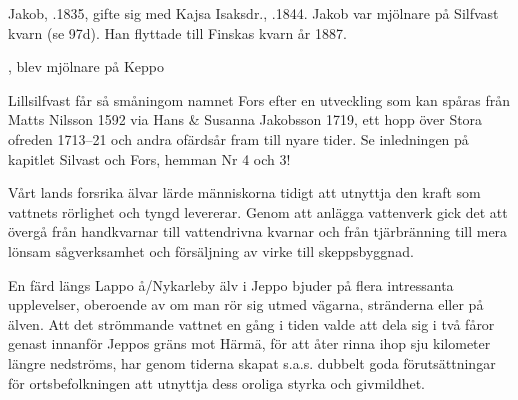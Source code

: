 %
Jakob, .1835, gifte sig med Kajsa Isaksdr., .1844. Jakob var mjölnare på Silfvast kvarn (se 97d). Han flyttade till Finskas kvarn år 1887.
\begin{jhchildren}
  \item {}, blev mjölnare på Keppo
  \item {}
  \item {}
  \item {}
  \item {}
  \item {}
\end{jhchildren}



%
Lillsilfvast får så småningom namnet Fors efter en utveckling som kan spåras från Matts Nilsson 1592 via Hans \& Susanna Jakobsson 1719, ett hopp över Stora ofreden 1713--21 och andra ofärdsår fram till nyare tider. Se inledningen på kapitlet Silvast och Fors, hemman Nr 4 och 3!



%


%
Vårt lands forsrika älvar lärde människorna tidigt att utnyttja den kraft som vattnets rörlighet och tyngd levererar. Genom att anlägga vattenverk gick det att övergå från handkvarnar till vattendrivna kvarnar och från tjärbränning till mera lönsam sågverksamhet och försäljning av virke till skeppsbyggnad.

En färd längs Lappo å/Nykarleby älv i Jeppo bjuder på flera intressanta upplevelser, oberoende av om man rör sig utmed vägarna, stränderna eller på älven. Att det strömmande vattnet en gång i tiden valde att dela sig i två fåror genast innanför Jeppos gräns mot Härmä, för att åter rinna ihop sju kilometer längre nedströms, har genom tiderna skapat s.a.s. dubbelt goda förutsättningar för ortsbefolkningen att utnyttja dess oroliga styrka och givmildhet.

